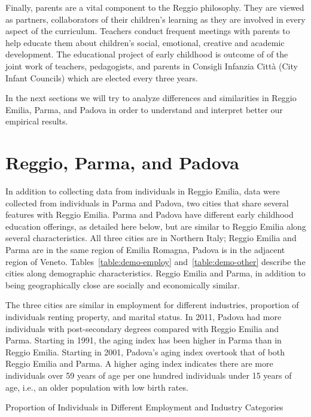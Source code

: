 \documentclass[12pt]{article}
\begin{document}
Finally, parents are a vital component to the Reggio philosophy. They are viewed as partners, collaborators of their children's learning as they are involved in every aspect of the curriculum. Teachers conduct frequent meetings with parents to help educate them about children's social, emotional, creative and academic development. The educational project of early childhood is outcome of of the joint work of teachers, pedagogists, and parents in Consigli Infanzia Citt\`{a} (City Infant Councils) which are elected every three years.

In the next sections we will try to analyze differences and similarities in Reggio Emilia, Parma, and Padova in order to understand and interpret better our empirical results.

\section{Reggio, Parma, and Padova} \label{sec:ParmaPadova}

In addition to collecting data from individuals in Reggio Emilia, data were collected from individuals in Parma and Padova, two cities that share several features with Reggio Emilia. %
Parma and Padova have different early childhood education offerings, as detailed here below, but are similar to Reggio Emilia along several characteristics. All three cities are in Northern Italy; Reggio Emilia and Parma are in the same region of Emilia Romagna, Padova is in the adjacent region of Veneto. Tables~\ref{table:demo-employ} and~\ref{table:demo-other} describe the cities along demographic characteristics. Reggio Emilia and Parma, in addition to being geographically close are socially and economically similar.

The three cities are similar in employment for different industries, proportion of individuals renting property, and marital status. In 2011, Padova had more individuals with post-secondary degrees compared with Reggio Emilia and Parma. Starting in 1991, the aging index has been higher in Parma than in Reggio Emilia. Starting in 2001, Padova's aging index overtook that of both Reggio Emilia and Parma. A higher aging index indicates there are more individuals over 59 years of age per one hundred individuals under 15 years of age, i.e., an older population with low birth rates.

\begin{landscape}
\begin{table}[ht!]
\begin{center}
\scriptsize{
	\caption{Proportion of Individuals in Different Employment and Industry Categories} \label{table:demo-employ}
	
}
\end{center}
\end{table}
\end{landscape}
\end{document}
